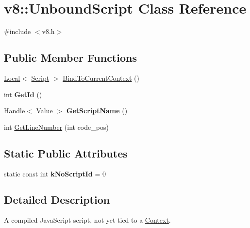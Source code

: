 \hypertarget{classv8_1_1_unbound_script}{}\section{v8\+:\+:Unbound\+Script Class Reference}
\label{classv8_1_1_unbound_script}


{\ttfamily \#include $<$v8.\+h$>$}

\subsection*{Public Member Functions}
\begin{DoxyCompactItemize}
\item 
\hyperlink{classv8_1_1_local}{Local}$<$ \hyperlink{classv8_1_1_script}{Script} $>$ \hyperlink{classv8_1_1_unbound_script_a0f3354dc71e3f831d10f6e82704a4c2b}{Bind\+To\+Current\+Context} ()
\item 
\hypertarget{classv8_1_1_unbound_script_a7ea1ef6cdb32a845b77a01c6113e7262}{}int {\bfseries Get\+Id} ()\label{classv8_1_1_unbound_script_a7ea1ef6cdb32a845b77a01c6113e7262}

\item 
\hypertarget{classv8_1_1_unbound_script_a1596ab75c9a2a105657531cd0062fbb4}{}\hyperlink{classv8_1_1_handle}{Handle}$<$ \hyperlink{classv8_1_1_value}{Value} $>$ {\bfseries Get\+Script\+Name} ()\label{classv8_1_1_unbound_script_a1596ab75c9a2a105657531cd0062fbb4}

\item 
int \hyperlink{classv8_1_1_unbound_script_a020ca8bbe6ea2313aeedc993ccac3741}{Get\+Line\+Number} (int code\+\_\+pos)
\end{DoxyCompactItemize}
\subsection*{Static Public Attributes}
\begin{DoxyCompactItemize}
\item 
\hypertarget{classv8_1_1_unbound_script_a2d36aeb3abd52d41cf05d1d5f036a0bd}{}static const int {\bfseries k\+No\+Script\+Id} = 0\label{classv8_1_1_unbound_script_a2d36aeb3abd52d41cf05d1d5f036a0bd}

\end{DoxyCompactItemize}


\subsection{Detailed Description}
A compiled Java\+Script script, not yet tied to a \hyperlink{classv8_1_1_context}{Context}. 


